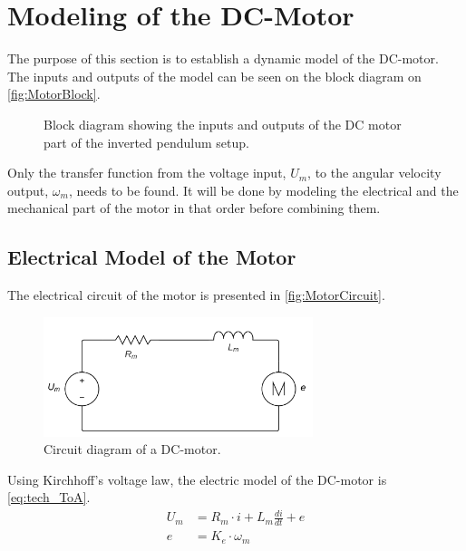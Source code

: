\section{Modeling of the DC-Motor}
The purpose of this section is to establish a dynamic model of the DC-motor. The inputs and outputs of the model can be seen on the block diagram on \autoref{fig:MotorBlock}.
\begin{figure}[htbp]
\centering
{}
\caption{Block diagram showing the inputs and outputs of the DC motor part of the inverted pendulum setup.}
\label{fig:MotorBlock}
\end{figure}

Only the transfer function from the voltage input, $U_m$, to the angular velocity output, $\omega_m$, needs to be found. It will be done by modeling the electrical and the mechanical part of the motor in that order before combining them.

\subsection{Electrical Model of the Motor}
The electrical circuit of the motor is presented in \autoref{fig:MotorCircuit}.
\begin{figure}[htbp]
	\centering
 	\includegraphics[width=0.7\textwidth]{figures/modeling/Motor/MotorElectricCircuit.pdf} 
 	\caption{Circuit diagram of a DC-motor.}
 	\label{fig:MotorCircuit}
\end{figure}

Using Kirchhoff's voltage law, the electric model of the DC-motor is \autoref{eq:tech_ToA}.
\begin{subequations} \label{eq:tech_ToA}
	\begin{flalign}
		U_m &= R_m \cdot i + L_m \frac{di}{dt} + e \\
		e &= K_e \cdot \omega_m 
	\end{flalign}
\end{subequations}
\startexplain
\stopexplain

